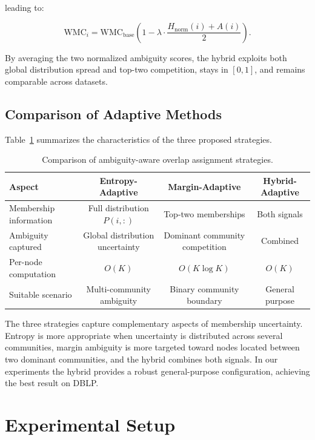 \documentclass[a4paper,11pt,oneside,onecolumn,preprint]{elsarticle}
\numberwithin{equation}{section}
\begin{document}
leading to:

\begin{equation}
\mathrm{WMC}_i =
\mathrm{WMC}_{\mathrm{base}}
\left(1-\lambda \cdot \frac{H_{\mathrm{norm}}(i) + A(i)}{2}\right).
\label{eq:hybrid-adaptive}
\end{equation}

By averaging the two normalized ambiguity scores, the hybrid exploits both global distribution spread and top-two competition, stays in $[0,1]$, and remains comparable across datasets.

\subsection{Comparison of Adaptive Methods}
\label{subsec:comparison}

Table~\ref{tab:method-comparison} summarizes the characteristics of the three proposed strategies.
	
\begin{table}[ht]
\centering
\caption{Comparison of ambiguity-aware overlap assignment strategies.}
\label{tab:method-comparison}
\begin{tabular}{lccc}
\toprule
\textbf{Aspect} & \textbf{Entropy-Adaptive} & \textbf{Margin-Adaptive} & \textbf{Hybrid-Adaptive} \\
\midrule
Membership information & Full distribution $P(i,:)$ & Top-two memberships & Both signals \\
Ambiguity captured & Global distribution uncertainty & Dominant community competition & Combined \\
Per-node computation & $O(K)$ & $O(K \log K)$ & $O(K)$ \\
Suitable scenario & Multi-community ambiguity & Binary community boundary & General purpose \\
\bottomrule
\end{tabular}
\end{table}

The three strategies capture complementary aspects of membership uncertainty.
Entropy is more appropriate when uncertainty is distributed across several communities, margin ambiguity is more targeted toward nodes located between two dominant communities, and the hybrid combines both signals.
In our experiments the hybrid provides a robust general-purpose configuration, achieving the best result on DBLP.
\section{Experimental Setup}
\label{sec:setup}
\end{document}
